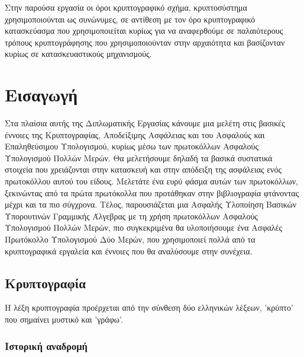 \newpage

Στην παρούσα εργασία οι όροι κρυπτογραφικό σχήμα, κρυπτοσύστημα χρησιμοποιούνται ως συνώνυμες, σε αντίθεση με τον όρο κρυπτογραφικό κατασκεύασμα που χρησιμοποιείται κυρίως για να αναφερθούμε σε παλαιότερους τρόπους κρυπτογράφησης που χρησιμοποιούνταν στην αρχαιότητα και βασίζονταν κυρίως σε κατασκευαστικούς μηχανισμούς.

\chapter{Εισαγωγή}

\label{chapter:intro}

Στα πλαίσια αυτής της Διπλωματικής Εργασίας κάνουμε μια μελέτη στις βασικές έννοιες της Κρυπτογραφίας, Αποδείξιμης Ασφάλειας και του Ασφαλούς και Επαληθεύσιμου Υπολογισμού, κυρίως μέσω των πρωτοκόλλων Ασφαλούς Υπολογισμού Πολλών Μερών. Θα μελετήσουμε δηλαδή τα βασικά συστατικά στοιχεία που χρειάζονται στην κατασκευή και στην απόδειξη της ασφάλειας ενός πρωτοκόλλου αυτού του είδους. Μελετάτε ένα ευρύ φάσμα αυτών των πρωτοκόλλων, ξεκινώντας από τα πρώτα πρωτόκολλα που προτάθηκαν στην βιβλιογραφία φτάνοντας μέχρι και τα πιο σύγχρονα. Τέλος, παρουσιάζεται μια Ασφαλής Υλοποίηση Βασικών Υπορουτινών Γραμμικής Άλγεβρας με τη χρήση πρωτοκόλλων Ασφαλούς Υπολογισμού Πολλών Μερών, πιο συγκεκριμένα θα υλοποιήσουμε ένα Ασφαλές Πρωτόκολλο Υπολογισμού Δύο Μερών, που χρησιμοποιεί πολλά από τα κρυπτογραφικά εργαλεία και έννοιες που θα αναλύσουμε στην συνέχεια.

\section{Κρυπτογραφία}

Η λέξη κρυπτογραφία προέρχεται από την σύνθεση δύο ελληνικών λέξεων, 'κρύπτο' που σημαίνει μυστικό και 'γράφω'.

\subsection{Ιστορική αναδρομή}

